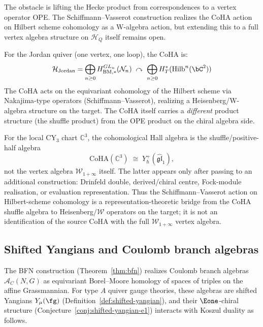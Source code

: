\begin{remark}[Scope]
The obstacle is lifting the Hecke product from correspondences to a vertex operator OPE. The Schiffmann--Vasserot construction \cite{SV13} realizes the CoHA action on Hilbert scheme cohomology as a W-algebra action, but extending this to a full vertex algebra structure on $\mathcal{H}_Q$ itself remains open.
\end{remark}

\begin{example}\label{ex:jordan-coha}
For the Jordan quiver (one vertex, one loop), the CoHA is:
\[
\mathcal{H}_{\text{Jordan}} = \bigoplus_{n \geq 0} H^{GL_n}_{\mathrm{BM},*}(\mathcal{N}_n) \;\curvearrowright\; \bigoplus_{n \geq 0} H^*_T(\mathrm{Hilb}^n(\bC^2))
\]
The CoHA acts on the equivariant cohomology of the Hilbert scheme via Nakajima-type operators (Schiffmann--Vasserot), realizing a Heisenberg/W-algebra structure on the target. The CoHA itself carries a \emph{different} product structure (the shuffle product) from the OPE product on the chiral algebra side.
\end{example}

\begin{remark}
\label{rem:coha-c3-positive-half}
For the local CY$_3$ chart $\mathbb C^3$, the cohomological Hall
algebra is the shuffle/positive-half algebra
\[
\mathrm{CoHA}(\mathbb C^3)\;\cong\;Y^+_\hbar(\widehat{\mathfrak{gl}}_1),
\]
not the vertex algebra $\mathcal W_{1+\infty}$ itself. The latter
appears only after passing to an additional construction: Drinfeld
double, derived/chiral centre, Fock-module realisation, or evaluation
representation. Thus the Schiffmann--Vasserot action on Hilbert-scheme
cohomology is a representation-theoretic bridge from the CoHA shuffle
algebra to Heisenberg/$\mathcal W$ operators on the target; it is not
an identification of the source CoHA with the full
$\mathcal W_{1+\infty}$ vertex algebra.
\end{remark}


\subsection{Shifted Yangians and Coulomb branch algebras}
\label{sec:shifted-coulomb}

The BFN construction (Theorem~\ref{thm:bfn}) realizes Coulomb branch
algebras $\mathcal{A}_C(N,G)$ as equivariant Borel--Moore homology of
spaces of triples on the affine Grassmannian. For type $A$ quiver gauge
theories, these algebras are shifted Yangians
$Y_\mu(\fg)$ (Definition~\ref{def:shifted-yangian}), and their
$\Eone$-chiral structure (Conjecture~\ref{conj:shifted-yangian-e1})
interacts with Koszul duality as follows.

